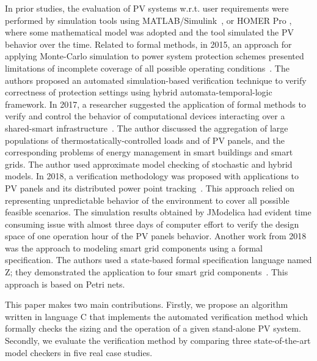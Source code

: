 \documentclass[review]{elsarticle}
\begin{document}
In prior studies, the evaluation of PV systems w.r.t. user requirements were performed by simulation tools using MATLAB/Simulink~\citep{Benatiallah2017, Natsheh2012}, or HOMER Pro \citep{Lamnadi2017}, where some mathematical model was adopted and the tool simulated the PV behavior over the time. Related to formal methods, in 2015, an approach for applying Monte-Carlo simulation to power system protection schemes presented limitations of incomplete coverage of all possible operating conditions~\citep{Sengupta2015}. The authors proposed an automated simulation-based verification technique to verify correctness of protection settings using hybrid automata-temporal-logic framework. In 2017, a researcher suggested the application of formal methods to verify and control the behavior of computational devices interacting over a shared-smart infrastructure~\citep{Abate2017}. The author discussed the aggregation of large populations of thermostatically-controlled loads and of PV panels, and the corresponding problems of energy management in smart buildings and smart grids. The author used approximate model checking of stochastic and hybrid models. In 2018, a verification methodology was proposed with applications to PV panels and its distributed power point tracking~\citep{Driouich2018}. This approach relied on representing unpredictable behavior of the environment to cover all possible feasible scenarios. The simulation results obtained by JModelica had evident time consuming issue with almost three days of computer effort to verify the design space of one operation hour of the PV panels behavior. Another work from 2018 was the approach to modeling smart grid components using a formal specification. The authors used a state-based formal specification language named Z; they demonstrated the application to four smart grid components~\citep{Akram2018}. This approach is based on Petri nets.

This paper makes two main contributions. %
Firstly, we propose an algorithm written in language C that implements the automated verification method which formally checks the sizing and the operation of a given stand-alone PV system. Secondly, we evaluate the verification method by comparing three state-of-the-art model checkers in five real case studies. %
\end{document}
